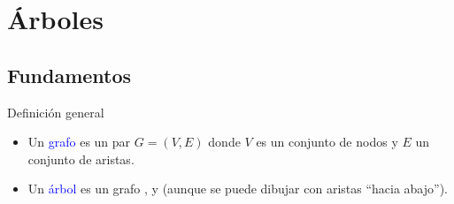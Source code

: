 \documentclass[handout]{beamer} %
\newcommand{\blue}[1]{\textcolor{blue}{#1}}
\newcommand{\redb}[1]{{\color{red!70!black}{#1}}}
\begin{document}

\section{Árboles}

\subsection{Fundamentos}

\begin{frame}{Definición general}
    \begin{itemize}
        \item<1-> Un \blue{grafo} es un par $G=(V,E)$ donde $V$ es un conjunto de nodos y $E$ un conjunto de aristas.
        \item<2-> Un \blue{árbol} es un grafo \redb{conexo}, \redb{acíclico} y \redb{no dirigido} (aunque se puede dibujar con aristas ``hacia abajo'').
    \end{itemize}
\end{frame}
\end{document}
